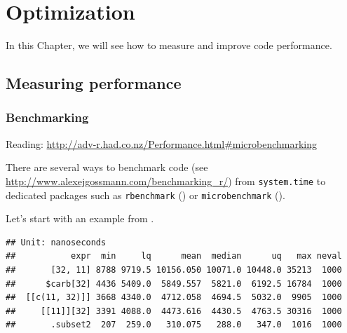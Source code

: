 \documentclass[]{book}
\newenvironment{Shaded}{\begin{snugshade}}{\end{snugshade}}
\newcommand{\KeywordTok}[1]{\textcolor[rgb]{0.13,0.29,0.53}{\textbf{#1}}}
\newcommand{\DataTypeTok}[1]{\textcolor[rgb]{0.13,0.29,0.53}{#1}}
\newcommand{\DecValTok}[1]{\textcolor[rgb]{0.00,0.00,0.81}{#1}}
\newcommand{\StringTok}[1]{\textcolor[rgb]{0.31,0.60,0.02}{#1}}
\newcommand{\CommentTok}[1]{\textcolor[rgb]{0.56,0.35,0.01}{\textit{#1}}}
\newcommand{\OperatorTok}[1]{\textcolor[rgb]{0.81,0.36,0.00}{\textbf{#1}}}
\newcommand{\NormalTok}[1]{#1}
\theoremstyle{definition}
\theoremstyle{definition}
\theoremstyle{definition}
\theoremstyle{remark}
\begin{document}
\chapter{Optimization}\label{optimization}

In this Chapter, we will see how to measure and improve code
performance.

\section{Measuring performance}\label{measuring-performance}

\subsection{Benchmarking}\label{benchmarking}

Reading:
\url{http://adv-r.had.co.nz/Performance.html\#microbenchmarking}

There are several ways to benchmark code (see
\url{http://www.alexejgossmann.com/benchmarking_r/}) from
\texttt{system.time} to dedicated packages such as \texttt{rbenchmark}
(\citet{rbenchmark}) or \texttt{microbenchmark}
(\citet{microbenchmark}).

Let's start with an example from \citet{Wickham2014}.

\begin{Shaded}
\end{Shaded}

\begin{verbatim}
## Unit: nanoseconds
##           expr  min     lq      mean  median      uq   max neval
##       [32, 11] 8788 9719.5 10156.050 10071.0 10448.0 35213  1000
##      $carb[32] 4436 5409.0  5849.557  5821.0  6192.5 16784  1000
##  [[c(11, 32)]] 3668 4340.0  4712.058  4694.5  5032.0  9905  1000
##     [[11]][32] 3391 4088.0  4473.616  4430.5  4763.5 30316  1000
##       .subset2  207  259.0   310.075   288.0   347.0  1016  1000
\end{verbatim}
\end{document}
